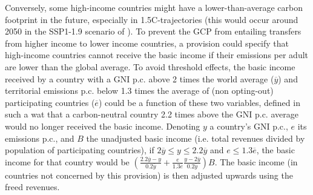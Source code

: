 \documentclass[12pt,english]{article}
\begin{document}
Conversely, some high-income countries might have a lower-than-average carbon footprint in the future, especially in 1.5\textdegree{}C-trajectories (this would occur around 2050 in the SSP1-1.9 scenario of \citealp{van_vuuren_energy_2017}). To prevent the GCP from entailing transfers from higher income to lower income countries, a provision could specify that high-income countries cannot receive the basic income if their emissions per adult are lower than the global average. To avoid threshold effects, the basic income received by a country with a GNI p.c. above 2 times the world average ($\overline{y}$) and territorial emissions p.c. below 1.3 times the average of (non opting-out) participating countries ($\overline{e}$) could be a function of these two variables, defined in such a wat that a carbon-neutral country 2.2 times above the GNI p.c. average would no longer received the basic income. Denoting $y$ a country's GNI p.c., $e$ its emissions p.c., and $B$ the unadjusted basic income (i.e. total revenues divided by population of participating countries), if $2\overline{y}\leq y\leq 2.2\overline{y}$ and $e \leq 1.3 \overline{e}$, the basic income for that country would be $\left( \frac{2.2\overline{y}-y}{0.2\overline{y}} + \frac{e}{1.3\overline{e}} \frac{y-2\overline{y}}{0.2\overline{y}} \right) B$. The basic income (in countries not concerned by this provision) is then adjusted upwards using the freed revenues.


\end{document}
